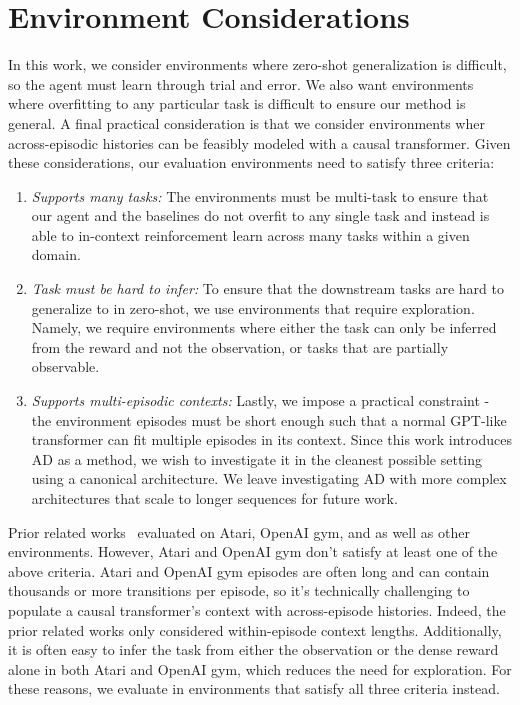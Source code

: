 \documentclass{article}
\theoremstyle{thm}
\newcommand{\name}{AD }
\begin{document}
\section{Environment Considerations}
\label{app:envs}
In this work, we consider environments where zero-shot generalization is difficult, so the agent must learn through trial and error. We also want environments where overfitting to any particular task is difficult to ensure our method is general. A final practical consideration is that we consider environments wher across-episodic histories can be feasibly modeled with a causal transformer. Given these considerations, our evaluation environments need to satisfy three criteria:
\begin{enumerate}
\item {\it Supports many tasks:} The environments must be multi-task to ensure that our agent and the baselines do not overfit to any single task and instead is able to in-context reinforcement learn across many tasks within a given domain.
\item {\it Task must be hard to infer:} To ensure that the downstream tasks are hard to generalize to in zero-shot, we use environments that require exploration. Namely, we require environments where either the task can only be inferred from the reward and not the observation, or tasks that are partially observable.
\item {\it Supports multi-episodic contexts:} Lastly, we impose a practical constraint - the environment episodes must be short enough such that a normal GPT-like transformer can fit multiple episodes in its context. Since this work introduces \name as a method, we wish to investigate it in the cleanest possible setting using a canonical architecture. We leave investigating \name with more complex architectures that scale to longer sequences for future work.
\end{enumerate}
Prior related works~\citep{chen2021dt, lee2022mgdt, janner2021tto, reed2022gato} evaluated on Atari, OpenAI gym, and as well as other environments. However, Atari and OpenAI gym don't satisfy at least one of the above criteria. Atari and OpenAI gym episodes are often long and can contain thousands or more transitions per episode, so it's technically challenging to populate a causal transformer's context with across-episode histories. Indeed, the prior related works only considered within-episode context lengths. Additionally, it is often easy to infer the task from either the observation or the dense reward alone in both Atari and OpenAI gym, which reduces the need for exploration. For these reasons, we evaluate in environments that satisfy all three criteria instead.
\end{document}
